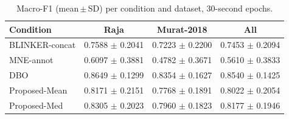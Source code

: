 \begin{table}[ht]
    \centering
    \caption{Macro-F1 (mean\,$\pm$\,SD) per condition and dataset, 30-second epochs.}
    \label{tab:strategy_by_dataset}
    \begin{tabular}{lccc}
        \toprule
        Condition & Raja & Murat-2018 & All \\
        \midrule
        BLINKER-concat & 0.7588 $\pm$ 0.2041 & 0.7223 $\pm$ 0.2200 & 0.7453 $\pm$ 0.2094 \\
        MNE-annot & 0.6097 $\pm$ 0.3881 & 0.4782 $\pm$ 0.3671 & 0.5610 $\pm$ 0.3833 \\
        DBO & 0.8649 $\pm$ 0.1299 & 0.8354 $\pm$ 0.1627 & 0.8540 $\pm$ 0.1425 \\
        Proposed-Mean & 0.8171 $\pm$ 0.2151 & 0.7768 $\pm$ 0.1891 & 0.8022 $\pm$ 0.2054 \\
        Proposed-Med & 0.8305 $\pm$ 0.2023 & 0.7960 $\pm$ 0.1823 & 0.8177 $\pm$ 0.1946 \\
        \bottomrule
    \end{tabular}
\end{table}
